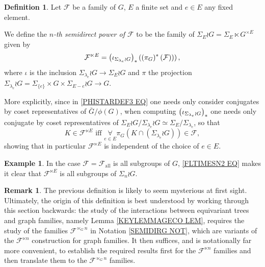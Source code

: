 \documentclass[a4paper,10pt
,draft
]{article}%
\numberwithin{equation}{section}
\numberwithin{figure}{section}
\theoremstyle{definition} %
\newtheorem{definition}[equation]{Definition}%
\newtheorem{example}[equation]{Example}%
\newtheorem{remark}[equation]{Remark}%
\newcommand{\F}{\ensuremath{\mathcal F}}
\newcommand{\1}{\ensuremath{\mathbbm 1}}%
\begin{document}
\begin{definition}\label{FLTIMESN DEF}
 Let $\mathcal{F}$ be a family of $G$,
 $E$ a finite set and $e \in E$ any fixed element.
 
We define the \textit{$n$-th semidirect power of $\mathcal{F}$} to be the family of $\Sigma_E \wr G = \Sigma_E \ltimes G^{\times E}$ given by
\[
	\mathcal{F}^{\ltimes E}
		=
	\left(
	\iota_{\Sigma_{\lambda_e} \wr G}
	\right)_{\**}
	\left(
		\left(
		\pi_{G})^{\**}\left(\mathcal{F}\right)
		\right)
	\right),
\]
where $\iota$ is the inclusion 
$\Sigma_{\lambda_e} \wr G
	\to 
\Sigma_E \wr G$
and $\pi$ the projection
$\Sigma_{\lambda_e} \wr G = \Sigma_{\{e\}} \times G \times \Sigma_{E-e} \wr G
\to G$.

More explicitly, since in \eqref{PHISTARDEF3 EQ} one needs only consider conjugates by coset representatives of $\bar{G}/\phi(G)$, when computing 
$\left( \iota_{\Sigma_{\lambda_e} \wr G}\right)_{\**}$
one needs only conjugate by coset representatives of 
$\Sigma_E \wr G/\Sigma_{\lambda_e} \wr G \simeq \Sigma_E/\Sigma_{\lambda_e}$, so that
\begin{equation}\label{FLTIMESN2 EQ}
	K \in \mathcal{F}^{\ltimes E} 
	\text{ iff }
	\underset{e \in E}{\forall} \pi_{G}
	\left(
		K \cap \left( \Sigma_{\lambda_e} \wr G \right)
	\right)
	\in \mathcal{F},
\end{equation}
showing that in particular $\mathcal{F}^{\ltimes E}$
is independent of the choice of $e \in E$.
\end{definition}

\begin{example}
      \label{F_ALL_EX}
      In the case $\F = \F_{\text{all}}$ is all subgroups of $G$,
      \eqref{FLTIMESN2 EQ} makes it clear that $\F^{\ltimes E}$ is all subgroups of $\Sigma_n \wr G$.
\end{example}

\begin{remark}
The previous definition is likely to seem mysterious at first sight. Ultimately, the origin of this definition
is best understood by working through this section backwards:
the study of the interactions between equivariant trees and graph families, namely Lemma \ref{KEYLEMMAGECO LEM}, requires the study of the families $\mathcal{F}^{\ltimes_G n}$ in Notation \ref{SEMIDIRG NOT}, which are variants of the $\mathcal{F}^{\ltimes n}$ construction for graph families.
It then suffices, and is notationally far more convenient, to establish the required results first for the $\mathcal{F}^{\ltimes n}$ families and then translate them to the $\mathcal{F}^{\ltimes_G n}$ families.
\end{remark}
\end{document}
